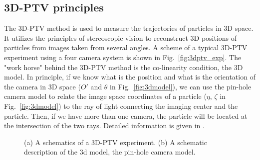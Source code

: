 \documentclass[10pt,a4paper]{article}
\begin{document}
\subsection{3D-PTV principles}


The 3D-PTV method is used to measure the trajectories of particles in 3D space. It utilizes the principles of stereoscopic vision to reconstruct 3D positions of particles from images taken from several angles. A scheme of a typical 3D-PTV experiment using a four camera system is shown in Fig.~\ref{fig:3dptv_exp}. The "work horse" behind the 3D-PTV method is the co-linearity condition, the 3D model. In principle, if we know what is the position and what is the orientation of the camera in 3D space ($O'$ and $\theta$ in Fig.~\ref{fig:3dmodel}), we can use the pin-hole camera model to relate the image space coordinates of a particle ($\eta,\, \zeta$ in Fig.~\ref{fig:3dmodel}) to the ray of light connecting the imaging center and the particle. Then, if we have more than one camera, the particle will be located at the intersection of the two rays. Detailed information is given in \cite{Virant1997, Maas1993}.  


\begin{figure}[!ht]
	\centering
	\hfill
	\caption{(a) A schematics of a 3D-PTV experiment. (b) A schematic description of the 3d model, the pin-hole camera model.}
\end{figure}
\end{document}
